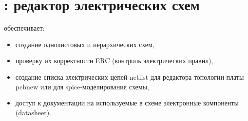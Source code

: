 
\section{: редактор электрических схем}

обеспечивает:

\begin{itemize}
\item создание однолистовых и иерархических схем,
\item проверку их корректности ERC (контроль электрических правил),
\item создание списка электрических цепей netlist для редактора топологии платы
pcbnew или для spice-моделирования схемы, 
\item доступ к документации на используемые в схеме электронные компоненты
(datasheet).
\end{itemize}

